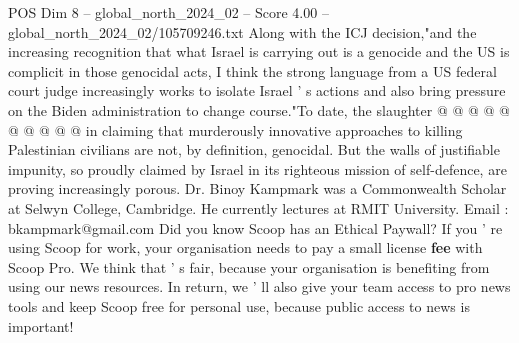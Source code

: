 \begin{textsample}{POS Dim 8 – global\_north\_2024\_02 – Score 4.00 – global\_north\_2024\_02/105709246.txt}
Along with the ICJ decision,"and the increasing recognition that what Israel is carrying out is a genocide and the US is complicit in those genocidal acts, I think the strong language from a US federal court judge increasingly works to isolate Israel ' s actions and also bring pressure on the Biden administration to change course."To date, the slaughter @ @ @ @ @ @ @ @ @ @ in claiming that murderously innovative approaches to killing Palestinian civilians are not, by definition, genocidal.
But the walls of justifiable impunity, so proudly claimed by Israel in its righteous mission of self-defence, are proving increasingly porous.
Dr.
Binoy Kampmark was a Commonwealth Scholar at Selwyn College, Cambridge.
He currently lectures at RMIT University.
Email : bkampmark@gmail.com Did you know Scoop has an Ethical Paywall?
If you ' re using Scoop for work, your organisation needs to pay a small license \textbf{fee} with Scoop Pro.
We think that ' s fair, because your organisation is benefiting from using our news resources.
In return, we ' ll also give your team access to pro news tools and keep Scoop free for personal use, because public access to news is important!

\end{textsample}

